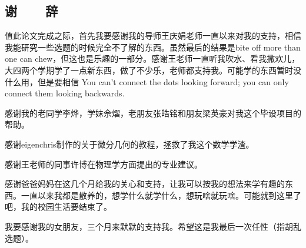 %
%
%
%
%
%

\begin{center}
\chapter*{\vskip 10bp \textbf{谢~~~~辞} \vskip -6bp}
\end{center}


值此论文完成之际，首先我要感谢我的导师王庆娟老师一直以来对我的支持，相信我能研究一些选题的时候完全不了解的东西。虽然最后的结果是bite off more than one can chew，但这也是乐趣的一部分。感谢王老师一直听我吹水、看我撒欢儿，大四两个学期学了一点新东西，做了不少乐，老师都支持我。可能学的东西暂时没什么用，但是要相信 You can't connect the dots looking forward; you can only connect them looking backwards\cite{steve_jobs_stanford}.

感谢我的老同学李烨，学妹佘熠，老朋友张皓铭和朋友梁英豪对我这个毕设项目的帮助。

感谢eigenchris制作的关于微分几何的教程，拯救了我这个数学学渣。

感谢王老师的同事许博在物理学方面提出的专业建议。

感谢爸爸妈妈在这几个月给我的关心和支持，让我可以按我的想法来学有趣的东西。一直以来我都是散养的，想学什么就学什么，想玩啥就玩啥。可能就到这里了吧，我的校园生活要结束了。

我要感谢我的女朋友，三个月来默默的支持我。希望这是我最后一次任性（指胡乱选题）。

